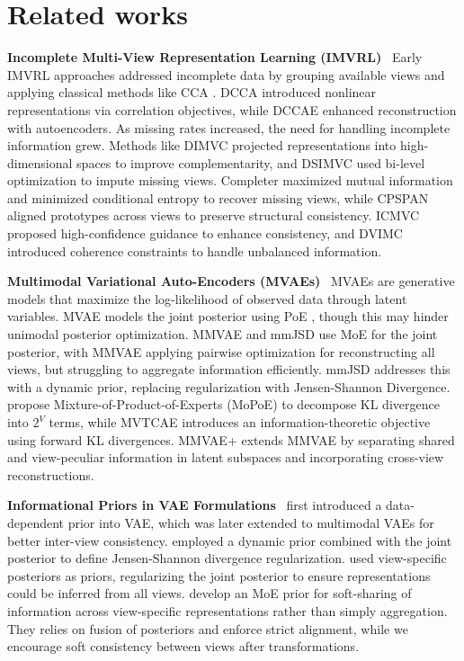 \section{Related works}
\label{sec:2}

\noindent \textbf{Incomplete Multi-View Representation Learning (IMVRL)}~ Early IMVRL approaches addressed incomplete data by grouping available views and applying classical methods like CCA \citep{hotelling1992relations}. DCCA \citep{DCCA} introduced nonlinear representations via correlation objectives, while DCCAE \citep{DCCAE} enhanced reconstruction with autoencoders. As missing rates increased, the need for handling incomplete information grew. Methods like DIMVC \citep{DIMVC} projected representations into high-dimensional spaces to improve complementarity, and DSIMVC \citep{DSIMVC} used bi-level optimization to impute missing views. Completer \citep{completer1, completer2} maximized mutual information and minimized conditional entropy to recover missing views, while CPSPAN \citep{CPSPAN} aligned prototypes across views to preserve structural consistency. ICMVC \citep{ICMVC} proposed high-confidence guidance to enhance consistency, and DVIMC \citep{DVIMVC} introduced coherence constraints to handle unbalanced information.

\noindent \textbf{Multimodal Variational Auto-Encoders (MVAEs)}~ MVAEs are generative models that maximize the log-likelihood of observed data through latent variables. MVAE \citep{wu2018multimodal} models the joint posterior using PoE \citep{hinton2002training}, though this may hinder unimodal posterior optimization. MMVAE \citep{shi2019variational} and mmJSD \citep{mmJSD} use MoE for the joint posterior, with MMVAE applying pairwise optimization for reconstructing all views, but struggling to aggregate information efficiently. mmJSD addresses this with a dynamic prior, replacing regularization with Jensen-Shannon Divergence. \cite{suttergeneralized} propose Mixture-of-Product-of-Experts (MoPoE) to decompose KL divergence into $2^V$ terms, while MVTCAE \citep{MVTCAE} introduces an information-theoretic objective using forward KL divergences. MMVAE+ \citep{palumbo2023mmvae+} extends MMVAE by separating shared and view-peculiar information in latent subspaces and incorporating cross-view reconstructions.

\noindent \textbf{Informational Priors in VAE Formulations}~ \citet{tomczak2018vae} first introduced a data-dependent prior into VAE, which was later extended to multimodal VAEs for better inter-view consistency. \citet{mmJSD} employed a dynamic prior combined with the joint posterior to define Jensen-Shannon divergence regularization. \citet{MVTCAE} used view-specific posteriors as priors, regularizing the joint posterior to ensure representations could be inferred from all views. \citet{sutter2024unity} develop an MoE prior for soft-sharing of information across view-specific representations rather than simply aggregation. They relies on fusion of posteriors and enforce strict alignment, while we encourage soft consistency between views after transformations.




